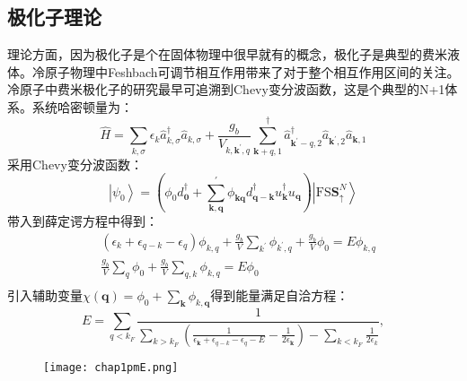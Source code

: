 \subsection{极化子理论}
理论方面，因为极化子是个在固体物理中很早就有的概念，极化子是典型的费米液体。冷原子物理中Feshbach可调节相互作用带来了对于整个相互作用区间的关注。冷原子中费米极化子的研究最早可追溯到Chevy变分波函数\cite{chevy2006}，这是个典型的N+1体系。系统哈密顿量为：
\begin{equation}
\hat{H}=\sum_{k, \sigma} \epsilon_{k} \hat{a}_{k, \sigma}^{\dagger} \hat{a}_{k, \sigma}+\frac{g_{b}}{V_{k, \boldsymbol{k}^{\prime}, q}} \sum_{\boldsymbol{k}+q, 1}^{\dagger} \hat{a}_{\boldsymbol{k}^{\prime}-q, 2}^{\dagger} \hat{a}_{\boldsymbol{k}^{\prime}, 2} \hat{a}_{\boldsymbol{k}, 1}
\end{equation}
采用Chevy变分波函数：
\begin{equation}
\left|\psi_{0}\right\rangle=\left(\phi_{0} d_{\mathbf{0}}^{\dagger}+\sum_{\mathbf{k}, \mathbf{q}}^{\prime} \phi_{\mathbf{k q}} d_{\mathbf{q}-\mathbf{k}}^{\dagger} u_{\mathbf{k}}^{\dagger} u_{\mathbf{q}}\right)\left|\mathrm{FS} \mathbf{S}_{\uparrow}^{N}\right\rangle
\end{equation}
带入到薛定谔方程中得到：
\begin{equation}
\begin{split}
&\left(\epsilon_{k}+\epsilon_{q-k}-\epsilon_{q}\right) \phi_{k, q}+\frac{g_{b}}{V} \sum_{k^{\prime}} \phi_{k^{\prime}, q}+\frac{g_{b}}{V} \phi_{0}=E \phi_{k, q}\\
&\frac{g_{b}}{V} \sum_{q} \phi_{0}+\frac{g_{b}}{V} \sum_{q, k} \phi_{k, q}=E \phi_{0}\\
\end{split}
\end{equation}
引入辅助变量$\chi(\boldsymbol{q})=\phi_{0}+\sum_{\boldsymbol{k}} \phi_{k, \boldsymbol{q}}$得到能量满足自洽方程：
\begin{equation}
E=\sum_{q<k_{F}} \frac{1}{\sum_{k>k_{F}}\left(\frac{1}{\epsilon_{\boldsymbol{k}}+\epsilon_{q-k}-\epsilon_{q}-E}-\frac{1}{2 \epsilon_{\boldsymbol{k}}}\right)-\sum_{k<k_{F}} \frac{1}{2 \epsilon_{k}}},
\end{equation}
\begin{figure}[!htbp]
    \centering
    \texttt{[image: chap1pmE.png]}
    \label{fpchevyE}
\end{figure}
